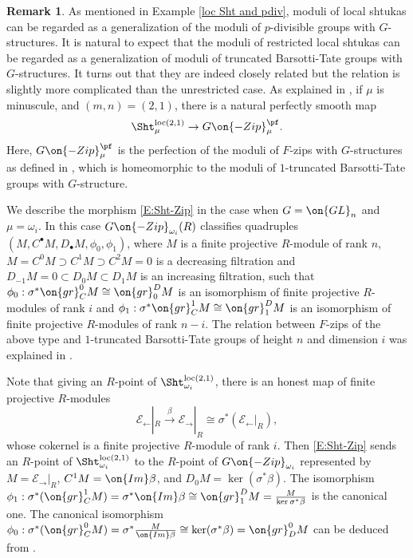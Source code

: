 \documentclass[11pt]{amsart}
\theoremstyle{definition}
\theoremstyle{definition}
\newtheorem{rmk}[thm]{Remark}
\theoremstyle{definition}
\numberwithin{equation}{subsection}
\newcommand{\mE}{{\mathcal E}}
\newcommand{\loc}{\mathrm{loc}}
\newcommand{\GL}{{\on{GL}}}
\newcommand{\leftone}{\leftarrow}
\newcommand{\rightone}{\to}
\begin{document}
 



\begin{rmk}
\label{Ex:Sht and GZip}
As mentioned in Example \ref{loc Sht and pdiv}, moduli of local shtukas can be regarded as a generalization of the moduli of $p$-divisible groups with $G$-structures. It is natural to expect that the moduli of restricted local shtukas can be regarded as a generalization of moduli of truncated Barsotti-Tate groups with $G$-structures. It turns out that they are indeed closely related but the relation is slightly more complicated than the unrestricted case. As explained in \cite[Lemma 5.3.6]{XZ}, if $\mu$ is minuscule, and $(m,n)=(2,1)$,
there is a natural perfectly smooth map
\begin{equation}
\label{E:Sht-Zip}
\Sht_\mu^{\loc(2,1)}\to G\on{-Zip}^\pf_\mu.
\end{equation}
Here, $G\on{-Zip}^\pf_\mu$ is the perfection of the moduli of $F$-zips with $G$-structures as defined in \cite{PWZ}, which is homeomorphic to the moduli of $1$-truncated Barsotti-Tate groups with $G$-structure. 

We describe the morphism \eqref{E:Sht-Zip} in  the case when $G=\GL_n$ and $\mu=\omega_i$. In this case $G\on{-Zip}_{\omega_i}(R)$ classifies quadruples $(M, C^\bullet M, D_\bullet M, \phi_0,\phi_1)$, where $M$ is a finite projective $R$-module of rank $n$, $M=C^0M\supset C^1M\supset C^2M=0$ is a decreasing filtration and $D_{-1}M=0\subset D_0M\subset D_1M$ is an increasing filtration, such that $\phi_0:\sigma^*\on{gr}_C^0M\cong \on{gr}_0^DM$ is an isomorphism of finite projective $R$-modules of rank $i$ and $\phi_1: \sigma^*\on{gr}_C^1M\cong \on{gr}_1^DM$ is an isomorphism of finite projective $R$-modules of rank $n-i$. The relation between $F$-zips of the above type and $1$-truncated Barsotti-Tate groups of height $n$ and dimension $i$ was explained in \cite[\S 9.3]{PWZ}.

Note that giving an $R$-point of $\Sht_{\omega_i}^{\loc(2,1)}$, there is an honest map of finite projective $R$-modules 
$$\mE_\leftone|_{R}\xrightarrow{\beta} \mE_\rightone|_{R}\cong \sigma^*(\mE_\leftone|_{R}),$$ whose cokernel is a finite projective $R$-module of rank $i$.
Then \eqref{E:Sht-Zip} sends an $R$-point of $\Sht_{\omega_i}^{\loc(2,1)}$ to the $R$-point of $G\on{-Zip}_{\omega_i}$ represented by $M=\mE_\rightone|_{R}$, $C^1M=\on{Im} \beta$, and $D_0M=\ker(\sigma^*\beta)$. The isomorphism $\phi_1: \sigma^*(\on{gr}_C^1M)=\sigma^*\on{Im}\beta\cong \on{gr}^D_1M=\frac{M}{\ker\sigma^*\beta}$ is the canonical one. 
The canonical isomorphism $\phi_0: \sigma^*(\on{gr}_C^0M)=\sigma^*\frac{M}{\on{Im}\beta}\cong \ker(\sigma^*\beta)=\on{gr}^0_DM$ can be deduced from \cite[(1.3.2)]{Zh1}.
\end{rmk}
\end{document}
